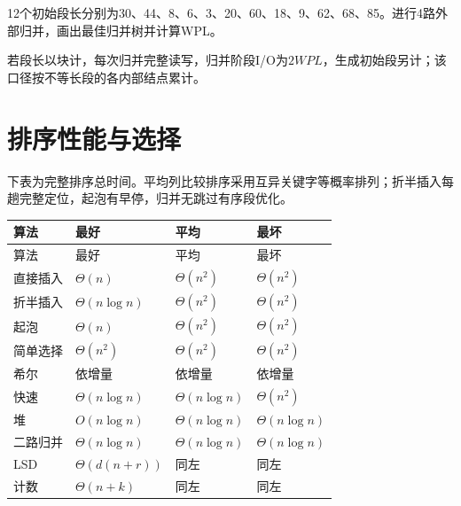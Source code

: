12个初始段长分别为30、44、8、6、3、20、60、18、9、62、68、85。进行4路外部归并，画出最佳归并树并计算WPL。

若段长以块计，每次归并完整读写，归并阶段I/O为\(2WPL\)，生成初始段另计；该口径按不等长段的各内部结点累计。

\section{排序性能与选择}\label{DS08-comparison}

下表为完整排序总时间。平均列比较排序采用互异关键字等概率排列；折半插入每趟完整定位，起泡有早停，归并无跳过有序段优化。

\par\smallskip
{\fontsize{9.3}{12}\selectfont\setlength{\tabcolsep}{2.5pt}\setlength{\LTleft}{0pt}\setlength{\LTright}{0pt}
\begin{longtable}{@{}>{\raggedright\arraybackslash}p{}>{\raggedright\arraybackslash}p{}>{\raggedright\arraybackslash}p{}>{\raggedright\arraybackslash}p{}@{}}
\toprule
算法 & 最好 & 平均 & 最坏 \\

\midrule\endfirsthead\toprule
算法 & 最好 & 平均 & 最坏 \\

\midrule\endhead\bottomrule\endfoot
直接插入 & \(\Theta(n)\) & \(\Theta(n^2)\) & \(\Theta(n^2)\) \\

折半插入 & \(\Theta(n\log n)\) & \(\Theta(n^2)\) & \(\Theta(n^2)\) \\

起泡 & \(\Theta(n)\) & \(\Theta(n^2)\) & \(\Theta(n^2)\) \\

简单选择 & \(\Theta(n^2)\) & \(\Theta(n^2)\) & \(\Theta(n^2)\) \\

希尔 & 依增量 & 依增量 & 依增量 \\

快速 & \(\Theta(n\log n)\) & \(\Theta(n\log n)\) & \(\Theta(n^2)\) \\

堆 & \(O(n\log n)\) & \(\Theta(n\log n)\) & \(\Theta(n\log n)\) \\

二路归并 & \(\Theta(n\log n)\) & \(\Theta(n\log n)\) & \(\Theta(n\log n)\) \\

LSD & \(\Theta(d(n+r))\) & 同左 & 同左 \\

计数 & \(\Theta(n+k)\) & 同左 & 同左 \\

\end{longtable}}
\par\smallskip

